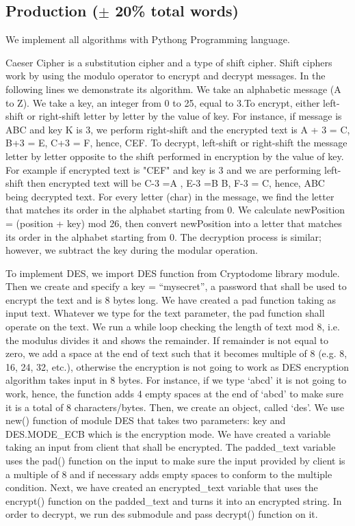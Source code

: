 \subsection{Production ($\pm$ 20\% total words)}

We implement all algorithms with Pythong Programming language. 

Caeser Cipher is a substitution cipher and a type of shift cipher. Shift ciphers work by using the modulo operator to encrypt and decrypt messages. In the following lines we demonstrate its algorithm. We take an alphabetic message (A to Z). We take a key, an integer from 0 to 25, equal to 3.To encrypt, either left-shift or right-shift letter by letter by the value of key. For instance, if message is ABC and key K is 3, we perform right-shift and the encrypted text is A + 3 = C, B+3 = E, C+3 = F, hence, CEF. To decrypt, left-shift or right-shift the message letter by letter opposite to the shift performed in encryption by the value of key. For example if encrypted text is "CEF" and key is 3 and we are performing left-shift then encrypted text will be C-3 =A , E-3 =B B, F-3 = C, hence, ABC being decrypted text. 
For every letter (char) in the message, we find the letter that matches its order in the alphabet starting from 0. We calculate newPosition = (position + key) mod 26, then convert newPosition into a letter that matches its order in the alphabet starting from 0. The decryption process is similar; however, we subtract the key during the modular operation.

To implement DES, we import DES function from Cryptodome library module. Then we create and specify a key = “mysecret”, a password that shall be used to encrypt the text and is 8 bytes long. We have created a pad function taking as input text. Whatever we type for the text parameter, the pad function shall operate on the text. We run a while loop checking the length of text mod 8, i.e. the modulus divides it and shows the remainder. If remainder is not equal to zero, we add a space at the end of text such that it becomes multiple of 8 (e.g. 8, 16, 24, 32, etc.), otherwise the encryption is not going to work as DES encryption algorithm takes input in 8 bytes. For instance, if we type ‘abcd’ it is not going to work, hence, the function adds 4 empty spaces at the end of ‘abcd’ to make sure it is a total of 8 characters/bytes. Then, we create an object, called ‘des’. We use new() function of module DES that takes two parameters: key and DES.MODE\_ECB which is the encryption mode. We have created a variable taking an input from client that shall be encrypted. The padded\_text variable uses the pad() function on the input to make sure the input provided by client is a multiple of 8 and if necessary adds empty spaces to conform to the multiple condition. Next, we have created an encrypted\_text variable that uses the encrypt() function on the padded\_text and turns it into an encrypted string. In order to decrypt, we run des submodule and pass decrypt() function on it. 



